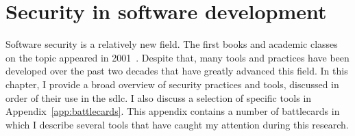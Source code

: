 \chapter{Security in software development}
\label{ch:related}

Software security is a relatively new field.
The first books and academic classes on the topic appeared in 2001~\cite{mcgraw2004software}.
Despite that, many tools and practices have been developed over the past two decades that have greatly advanced this field.
In this chapter, I provide a broad overview of security practices and tools, discussed in order of their use in the \gls{sdlc}.
I also discuss a selection of specific tools in Appendix~\ref{app:battlecards}.
This appendix contains a number of battlecards in which I describe several tools that have caught my attention during this research.








